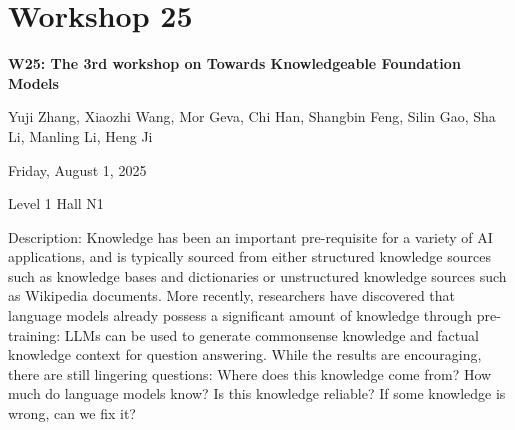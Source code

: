 \clearpage


\section[W25: The 3rd workshop on Towards Knowledgeable Foundation Models]{Workshop 25}

\begin{center}
    {\Large \textbf{W25: The 3rd workshop on Towards Knowledgeable Foundation Models}}

Yuji Zhang, Xiaozhi Wang, Mor Geva, Chi Han, Shangbin Feng, Silin Gao, Sha Li, Manling Li, Heng Ji

    Friday, August 1, 2025

 Level 1 Hall N1
    
\end{center}

Description: Knowledge has been an important pre-requisite for a variety of AI applications, and is typically sourced from either structured knowledge sources such as knowledge bases and dictionaries or unstructured knowledge sources such as Wikipedia documents. More recently, researchers have discovered that language models already possess a significant amount of knowledge through pre-training: LLMs can be used to generate commonsense knowledge and factual knowledge context for question answering. While the results are encouraging, there are still lingering questions: Where does this knowledge come from? How much do language models know? Is this knowledge reliable? If some knowledge is wrong, can we fix it?

